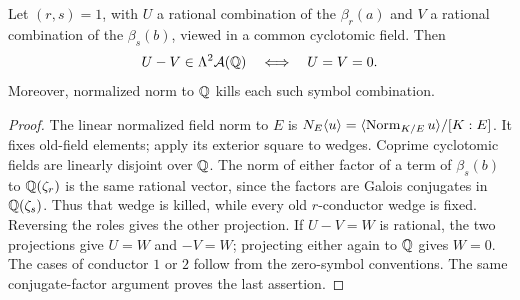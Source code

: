 \begin{lemma}\label{lem:norm}
Let $(r,s)=1$, with $U$ a rational combination of the $\beta_r(a)$ and
$V$ a rational combination of the $\beta_s(b)$, viewed in a common
cyclotomic field. Then
\[
 U-V\in\Lambda^2\mathcal A(\mathbb Q)\quad\Longleftrightarrow\quad U=V=0.
\]
Moreover, normalized norm to $\mathbb Q$ kills each such symbol combination.
\end{lemma}
\begin{proof}
The linear normalized field norm to $E$ is
$N_E\langle u\rangle=\langle \operatorname{Norm}_{K/E}u\rangle/[K:E]$. It fixes old-field elements;
apply its exterior square to wedges. Coprime cyclotomic fields are
linearly disjoint over $\mathbb Q$. The norm of either factor of a term of
$\beta_s(b)$ to $\mathbb Q(\zeta_r)$ is the same rational vector, since the
factors are Galois conjugates in $\mathbb Q(\zeta_s)$. Thus that wedge is
killed, while every old $r$-conductor wedge is fixed. Reversing the
roles gives the other projection. If $U-V=W$ is rational, the two
projections give $U=W$ and $-V=W$; projecting either again to $\mathbb Q$
gives $W=0$. The cases of conductor $1$ or $2$ follow from the
zero-symbol conventions. The same conjugate-factor argument proves
the last assertion.
\end{proof}
